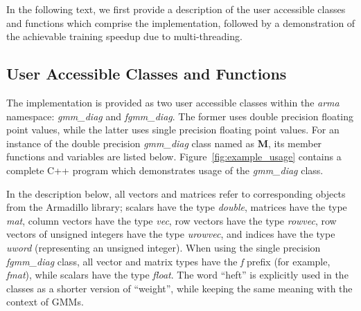 In the following text, we first provide a description of the user accessible classes and functions which comprise the implementation,
followed by a demonstration of the achievable training speedup due to multi-threading.

\subsection{User Accessible Classes and Functions}

The implementation is provided as two user accessible classes within the {\it arma} namespace:
{\it gmm\_diag} and {\it fgmm\_diag}.
The former uses double precision floating point values, while the latter uses single precision floating point values.
For an instance of the double precision {\it gmm\_diag} class named as {\bf M},
its member functions and variables are listed below.
Figure~\ref{fig:example_usage} contains a complete C++ program which demonstrates usage of the {\it gmm\_diag} class.

In the description below, all vectors and matrices refer to corresponding objects from the Armadillo library;
scalars have the type {\it double},
matrices have the type {\it mat},
column vectors have the type {\it vec},
row vectors have the type {\it rowvec},
row vectors of unsigned integers have the type {\it urowvec},
and indices have the type {\it uword} (representing an unsigned integer).
When using the single precision {\it fgmm\_diag} class,
all vector and matrix types have the {\it f} prefix (for example, {\it fmat}),
while scalars have the type {\it float}.
The word ``heft'' is explicitly used in the classes as a shorter version of ``weight'', while keeping the same meaning with the context of GMMs.

